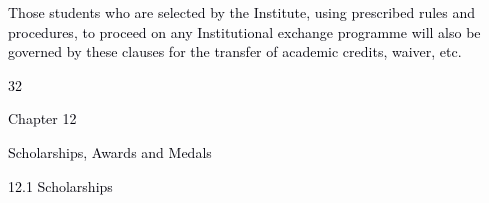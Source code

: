 \documentclass[12pt]{article}
\begin{document}
\vspace{\baselineskip}
{\fontsize{9pt}{10.8pt}\selectfont \textcolor[HTML]{00000A}{Those students who are selected by the Institute, using prescribed rules and procedures, to proceed on any Institutional exchange programme will also be governed by these clauses for the transfer of academic credits, waiver, etc.}\par}\par


\vspace{\baselineskip}

\vspace{\baselineskip}

\vspace{\baselineskip}

\vspace{\baselineskip}

\vspace{\baselineskip}

\vspace{\baselineskip}

\vspace{\baselineskip}

\vspace{\baselineskip}

\vspace{\baselineskip}

\vspace{\baselineskip}

\vspace{\baselineskip}

\vspace{\baselineskip}
\begin{Center}
\textcolor[HTML]{00000A}{32}
\end{Center}\par


\vspace{\baselineskip}
{\fontsize{14pt}{16.8pt}\selectfont \textcolor[HTML]{00000A}{Chapter 12}\par}\par


\vspace{\baselineskip}
{\fontsize{20pt}{24.0pt}\selectfont \textcolor[HTML]{00000A}{Scholarships, Awards and Medals}\par}\par


\vspace{\baselineskip}
\textcolor[HTML]{00000A}{12.1 Scholarships}\par
\end{document}
